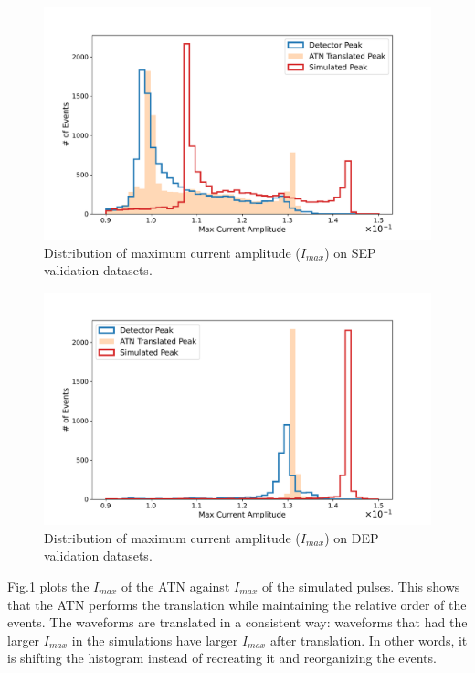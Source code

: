 \begin{figure}%
\centering
\includegraphics[width=0.9\linewidth,trim={0pc 0pc 0pc 0pc},clip]{ch8/figs/SEP_amp.pdf}
\caption{ Distribution of maximum current amplitude ($I_{max}$) on SEP validation datasets.}
\label{ch8_fig_current_amp_sep}
\end{figure}

\begin{figure}%
\centering
\includegraphics[width=0.9\linewidth,trim={0pc 0pc 0pc 0pc},clip]{ch8/figs/DEP_amp.pdf}
\caption{ Distribution of maximum current amplitude ($I_{max}$) on DEP validation datasets.}
\label{ch8_fig_current_amp_dep}
\end{figure}

Fig.\ref{ch8_fig_current_amp_sep} plots the $I_{max}$ of the ATN against $I_{max}$ of the simulated pulses. This shows that the ATN performs the translation while maintaining the relative order of the events. The waveforms are translated in a consistent way: waveforms that had the larger $I_{max}$ in the simulations have larger $I_{max}$ after translation. In other words, it is shifting the histogram instead of recreating it and reorganizing the events.

